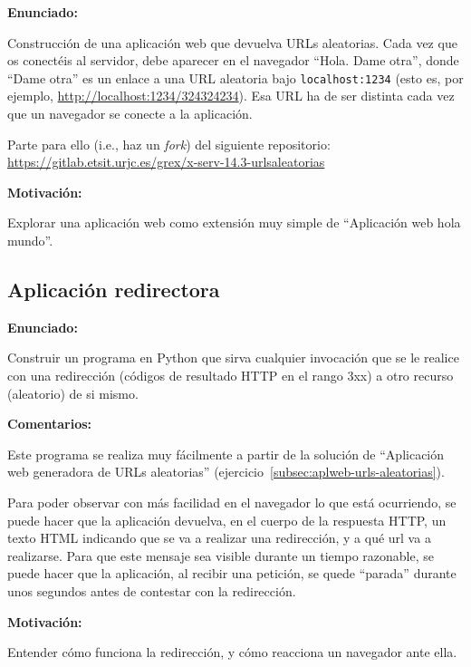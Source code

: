 \textbf{Enunciado:}

Construcción de una aplicación web que devuelva URLs aleatorias. Cada vez que os conectéis al servidor, debe aparecer en el navegador ``Hola. Dame otra'', donde ``Dame otra'' es un enlace a una URL aleatoria bajo \verb|localhost:1234| (esto es, por ejemplo, \url{http://localhost:1234/324324234}). Esa URL ha de ser distinta cada vez que un navegador se conecte a la aplicación.

Parte para ello (i.e., haz un \emph{fork}) del siguiente repositorio: \url{https://gitlab.etsit.urjc.es/grex/x-serv-14.3-urlsaleatorias}

\textbf{Motivación:}

Explorar una aplicación web como extensión muy simple de ``Aplicación web hola mundo''.

\subsection{Aplicación redirectora}
\label{subsec:aplweb-redirectora}

\textbf{Enunciado:}

Construir un programa en Python que sirva cualquier invocación que se le realice con una redirección (códigos de resultado HTTP en el rango 3xx) a otro recurso (aleatorio) de si mismo. 

\textbf{Comentarios:}

Este programa se realiza muy fácilmente a partir de la solución de ``Aplicación web generadora de URLs aleatorias'' (ejercicio~\ref{subsec:aplweb-urls-aleatorias}).

Para poder observar con más facilidad en el navegador lo que está ocurriendo, se puede hacer que la aplicación devuelva, en el cuerpo de la respuesta HTTP, un texto HTML indicando que se va a realizar una redirección, y a qué url va a realizarse. Para que este mensaje sea visible durante un tiempo razonable, se puede hacer que la aplicación, al recibir una petición, se quede ``parada'' durante unos segundos antes de contestar con la redirección.

\textbf{Motivación:}

Entender cómo funciona la redirección, y cómo reacciona un navegador ante ella.

